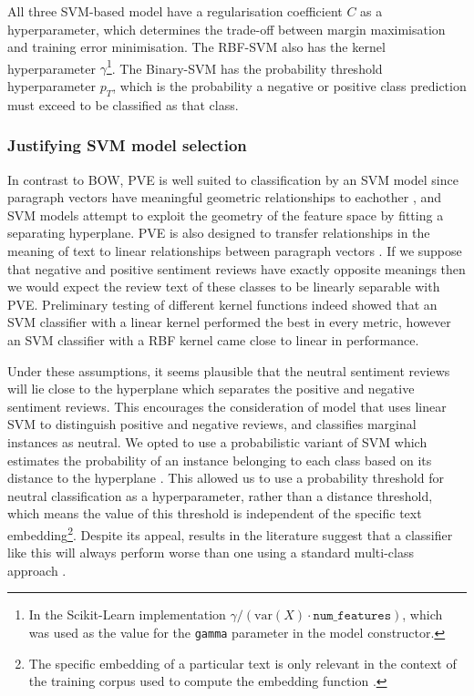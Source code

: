 \documentclass[11pt]{article}
\begin{document}
All three SVM-based model have a regularisation coefficient $C$ as a hyperparameter, which determines the trade-off between margin maximisation and training error minimisation. The RBF-SVM also has the kernel hyperparameter $\gamma$\footnote{In the Scikit-Learn implementation $\gamma/(\textrm{var}(X) \cdot \texttt{num\_features} )$, which was used as the value for the \texttt{gamma} parameter in the model constructor.}. The Binary-SVM has the probability threshold hyperparameter $p_T$, which is the probability a negative or positive class prediction must exceed to be classified as that class.

\subsubsection*{Justifying SVM model selection}
In contrast to BOW, PVE is well suited to classification by an SVM model since paragraph vectors have meaningful geometric relationships to eachother \cite{le_distributed_2014}, and SVM models attempt to exploit the geometry of the feature space by fitting a separating hyperplane. PVE is also designed to transfer relationships in the meaning of text to linear relationships between paragraph vectors \cite{le_distributed_2014}. If we suppose that negative and positive sentiment reviews have exactly opposite meanings then we would expect the review text of these classes to be linearly separable with PVE. Preliminary testing of different kernel functions indeed showed that an SVM classifier with a linear kernel performed the best in every metric, however an SVM classifier with a RBF kernel came close to linear in performance.

Under these assumptions, it seems plausible that the neutral sentiment reviews will lie close to the hyperplane which separates the positive and negative sentiment reviews. This encourages the consideration of model that uses linear SVM to distinguish positive and negative reviews, and classifies marginal instances as neutral. We opted to use a probabilistic variant of SVM which estimates the probability of an instance belonging to each class based on its distance to the hyperplane \cite{platt_probabilistic_1999}. This allowed us to use a probability threshold for neutral classification as a hyperparameter, rather than a distance threshold, which means the value of this threshold is independent of the specific text embedding\footnote{The specific embedding of a particular text is only relevant in the context of the training corpus used to compute the embedding function \cite{le_distributed_2014}.}. Despite its appeal, results in the literature suggest that a classifier like this will always perform worse than one using a standard multi-class approach \cite{koppel_importance_2006}.
\end{document}
